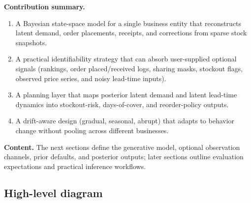 \documentclass[11pt]{article}
\begin{document}
\textbf{Contribution summary.}
\begin{enumerate}
  \item A Bayesian state-space model for a single business entity that reconstructs latent demand, order placements, receipts, and corrections from sparse stock snapshots.
  \item A practical identifiability strategy that can absorb user-supplied optional signals (rankings, order placed/received logs, sharing masks, stockout flags, observed price series, and noisy lead-time inputs).
  \item A planning layer that maps posterior latent demand and latent lead-time dynamics into stockout-risk, days-of-cover, and reorder-policy outputs.
  \item A drift-aware design (gradual, seasonal, abrupt) that adapts to behavior change without pooling across different businesses.
\end{enumerate}

\textbf{Content.} The next sections define the generative model, optional observation channels, prior defaults, and posterior outputs; later sections outline evaluation expectations and practical inference workflows.

\subsection*{High-level diagram}
\end{document}
